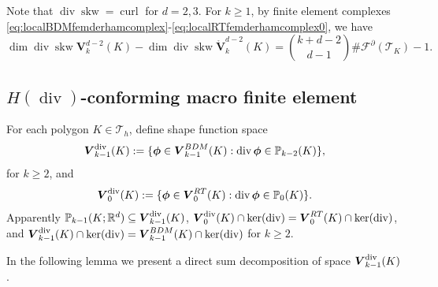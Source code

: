 \documentclass[10pt]{amsart}
\newcommand{\curl}{\operatorname{curl}}
\renewcommand{\div}{\operatorname{div}}
\newcommand{\skw}{\operatorname{skw}}
\numberwithin{equation}{section}
\begin{document}
Note that $\div\skw=\curl$ for $d=2,3$.
For $k\geq1$, by finite element complexes \eqref{eq:localBDMfemderhamcomplex}-\eqref{eq:localRTfemderhamcomplex0}, we have
\begin{equation}\label{eq:20220324-4}
\dim\div\skw\boldsymbol{V}_{k}^{d-2}(K)-\dim\div\skw\mathring{\boldsymbol{V}}_{k}^{d-2}(K)={k+d-2\choose d-1}\#\mathcal F^{\partial}(\mathcal T_K)-1.
\end{equation}

\subsection{$H(\div)$-conforming macro finite element}
For each polygon $K\in \mathcal T_h$, 
define shape function space
$$
\boldsymbol{V}_{k-1}^{\rm div}(K):=\{\boldsymbol{\phi}\in\boldsymbol{V}_{k-1}^{BDM}(K): \div\boldsymbol{\phi}\in\mathbb P_{k-2}(K)\},
$$
for $k\geq 2$, and $$
\boldsymbol{V}_{0}^{\rm div}(K):=\{\boldsymbol{\phi}\in\boldsymbol{V}_{0}^{RT}(K): \div\boldsymbol{\phi}\in\mathbb P_{0}(K)\}.
$$
Apparently $\mathbb P_{k-1}(K;\mathbb R^d)\subseteq\boldsymbol{V}_{k-1}^{\rm div}(K)$, $\boldsymbol{V}_{0}^{\rm div}(K)\cap\ker(\div)=\boldsymbol{V}_0^{RT}(K)\cap\ker(\div)$, and $\boldsymbol{V}_{k-1}^{\rm div}(K)\cap\ker(\div)=\boldsymbol{V}_{k-1}^{BDM}(K)\cap\ker(\div)$ for $k\geq2$.


In the following lemma we present a direct sum decomposition of space $\boldsymbol{V}_{k-1}^{\rm div}(K)$.
\end{document}
